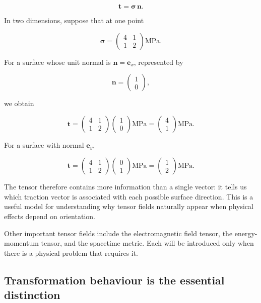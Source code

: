 \[
\mathbf{t}=\boldsymbol{\sigma}\,\mathbf{n}.
\]

In two dimensions, suppose that at one point

\[
\boldsymbol{\sigma}
=
\begin{pmatrix}
4 & 1\\
1 & 2
\end{pmatrix}
\mathrm{MPa}.
\]

For a surface whose unit normal is \(\mathbf{n}=\mathbf{e}_{x}\), represented by

\[
\mathbf{n}
=
\begin{pmatrix}
1\\
0
\end{pmatrix},
\]

we obtain

\[
\mathbf{t}
=
\begin{pmatrix}
4 & 1\\
1 & 2
\end{pmatrix}
\begin{pmatrix}
1\\
0
\end{pmatrix}
\mathrm{MPa}
=
\begin{pmatrix}
4\\
1
\end{pmatrix}
\mathrm{MPa}.
\]

For a surface with normal \(\mathbf{e}_{y}\),

\[
\mathbf{t}
=
\begin{pmatrix}
4 & 1\\
1 & 2
\end{pmatrix}
\begin{pmatrix}
0\\
1
\end{pmatrix}
\mathrm{MPa}
=
\begin{pmatrix}
1\\
2
\end{pmatrix}
\mathrm{MPa}.
\]

The tensor therefore contains more information than a single vector: it tells us which traction vector is associated with each possible surface direction. This is a useful model for understanding why tensor fields naturally appear when physical effects depend on orientation.

Other important tensor fields include the electromagnetic field tensor, the energy-momentum tensor, and the spacetime metric. Each will be introduced only when there is a physical problem that requires it.

\subsection{Transformation behaviour is the essential distinction}

